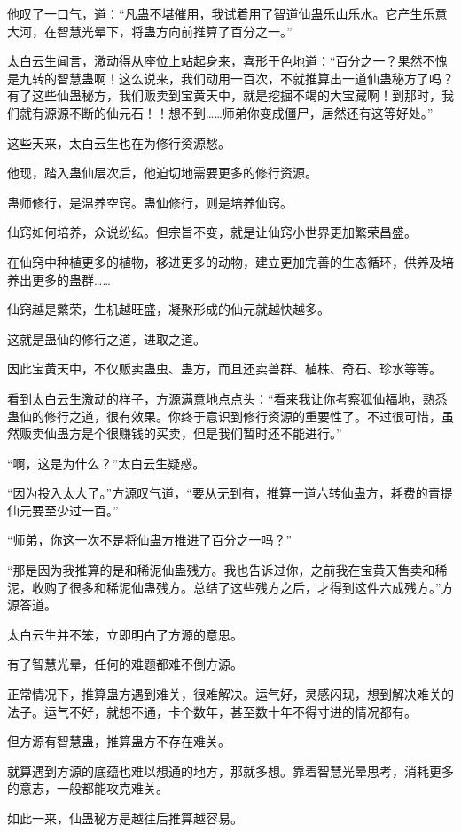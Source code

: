 \begin{this_body}
他叹了一口气，道：“凡蛊不堪催用，我试着用了智道仙蛊乐山乐水。它产生乐意大河，在智慧光晕下，将蛊方向前推算了百分之一。”

太白云生闻言，激动得从座位上站起身来，喜形于色地道：“百分之一？果然不愧是九转的智慧蛊啊！这么说来，我们动用一百次，不就推算出一道仙蛊秘方了吗？有了这些仙蛊秘方，我们贩卖到宝黄天中，就是挖掘不竭的大宝藏啊！到那时，我们就有源源不断的仙元石！！想不到……师弟你变成僵尸，居然还有这等好处。”

这些天来，太白云生也在为修行资源愁。

他现，踏入蛊仙层次后，他迫切地需要更多的修行资源。

蛊师修行，是温养空窍。蛊仙修行，则是培养仙窍。

仙窍如何培养，众说纷纭。但宗旨不变，就是让仙窍小世界更加繁荣昌盛。

在仙窍中种植更多的植物，移进更多的动物，建立更加完善的生态循环，供养及培养出更多的蛊群……

仙窍越是繁荣，生机越旺盛，凝聚形成的仙元就越快越多。

这就是蛊仙的修行之道，进取之道。

因此宝黄天中，不仅贩卖蛊虫、蛊方，而且还卖兽群、植株、奇石、珍水等等。

看到太白云生激动的样子，方源满意地点点头：“看来我让你考察狐仙福地，熟悉蛊仙的修行之道，很有效果。你终于意识到修行资源的重要性了。不过很可惜，虽然贩卖仙蛊方是个很赚钱的买卖，但是我们暂时还不能进行。”

“啊，这是为什么？”太白云生疑惑。

“因为投入太大了。”方源叹气道，“要从无到有，推算一道六转仙蛊方，耗费的青提仙元要至少过一百。”

“师弟，你这一次不是将仙蛊方推进了百分之一吗？”

“那是因为我推算的是和稀泥仙蛊残方。我也告诉过你，之前我在宝黄天售卖和稀泥，收购了很多和稀泥仙蛊残方。总结了这些残方之后，才得到这件六成残方。”方源答道。

太白云生并不笨，立即明白了方源的意思。

有了智慧光晕，任何的难题都难不倒方源。

正常情况下，推算蛊方遇到难关，很难解决。运气好，灵感闪现，想到解决难关的法子。运气不好，就想不通，卡个数年，甚至数十年不得寸进的情况都有。

但方源有智慧蛊，推算蛊方不存在难关。

就算遇到方源的底蕴也难以想通的地方，那就多想。靠着智慧光晕思考，消耗更多的意志，一般都能攻克难关。

如此一来，仙蛊秘方是越往后推算越容易。


\end{this_body}
